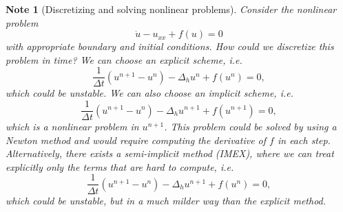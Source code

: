 \documentclass{article}
\newtheorem{note}{Note}
\begin{document}
\begin{note}[Discretizing and solving nonlinear problems]
    Consider the nonlinear problem
    $$ \dot{u} - u_{xx} + f(u) = 0$$
    with appropriate boundary and initial conditions. How could we discretize this problem in time? We can choose an explicit scheme, i.e.
    $$\frac{1}{\Delta t} (u^{n+1}-u^n) - \Delta_h u^n + f(u^n) = 0,$$
    which could be unstable. We can also choose an implicit scheme, i.e.
    $$\frac{1}{\Delta t} (u^{n+1}-u^n) - \Delta_h u^{n+1} + f(u^{n+1}) = 0,$$
    which is a nonlinear problem in $u^{n+1}$. This problem could be solved by using a Newton method and would require computing the derivative of $f$ in each step. Alternatively, there exists a semi-implicit method (IMEX), where we can treat explicitly only the terms that are hard to compute, i.e.
    $$\frac{1}{\Delta t} (u^{n+1}-u^n) - \Delta_h u^{n+1} + f(u^{n}) = 0,$$
    which could be unstable, but in a much milder way than the explicit method. 
\end{note}
\end{document}
